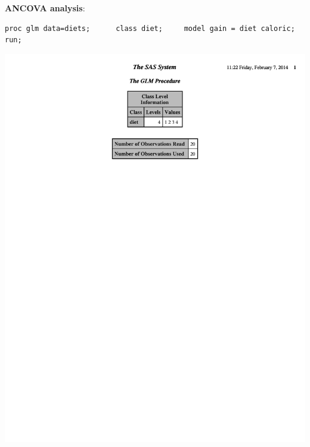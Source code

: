 \newpage

\textbf{ANCOVA analysis}:
\begin{small}
\begin{verbatim}
proc glm data=diets;      class diet;     model gain = diet caloric;    run;
\end{verbatim}
\end{small}

\begin{flushleft}
\includegraphics[page=2,scale=0.7,trim = 5mm 120mm 5mm 5mm]{DietsANCOVA}

\end{flushleft}
